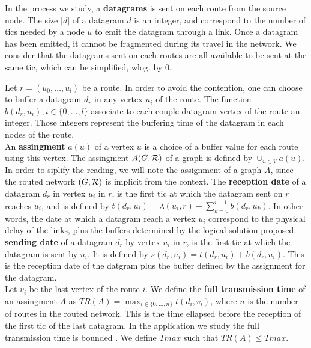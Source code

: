 \documentclass[english]{article}
\begin{document}
        In the process we study, a {\bf datagrams} is sent on each route from the source node. The size $|d|$ of a datagram $d$ is an integer, and correspond to the number of tics needed by a node $u$ to emit the datagram through a link. Once a datagram has been emitted, it cannot be fragmented during its travel in the network. We consider that the datagrams sent on each routes are all available to be sent at the same tic, which can be simplified, wlog. by $0$.
      
        
          Let $r=(u_0,\dots,u_l)$ be a route. In order to avoid the contention, one can choose to buffer a datagram $d_r$ in any vertex $u_i$ of the route. The function $b(d_r,u_i), i \in \{0,\ldots,l\}$ associate to each couple datagram-vertex of the route an integer. Those integers represent the buffering time of the datagram in each nodes of the route.\\
       

 An \textbf{assingment} $a(u)$ of a vertex $u$ is a choice of a buffer value for each route using this vertex. The assingment $A(G,{\cal R})$ of a graph is defined by $\cup_{u \in V} a(u)$. In order to siplify the reading, we will note the assignment of a graph $A$, since the routed network $(G,{\cal R})$ is implicit from the context. The \textbf{reception date} of a datagram $d_r$ in vertex $u_i$ in $r$, is the first tic at which the datagram sent on $r$ reaches $u_i$, and is defined by $t(d_r,u_i) = \lambda(u_i,r) + \sum_{k=0}^{i-1} b(d_r,u_k) $. In other words, the date at which a datagram reach a vertex $u_i$ correspond to the physical delay of the links, plus the buffers determined by the logical solution proposed.\\
 \textbf{sending date} of a datagram $d_r$ by vertex $u_i$ in $r$, is the first tic at which the datagram is sent by $u_i$. It is defined by $s(d_r,u_i) = t(d_r,u_i) +  b(d_r,u_i) $. This is the reception date of the datgram plus the buffer defined by the assignment for the datagram.\\
 
  Let $v_i$ be the last vertex of the route $i$.
       We define the \textbf{full transmission time} of an assingment $A$ as $TR(A) = \displaystyle \max_{i \in \{0,\ldots,n\}} t(d_i,v_i) $, where $n$ is the number of routes in the routed network. This is the time ellapsed before the reception of the first tic of the last datagram.
         In the application we study the full transmission time is bounded . We define $Tmax$ such that $TR(A) \leq Tmax$.
         
\end{document}
